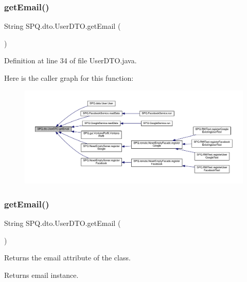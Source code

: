 \subsubsection{\texorpdfstring{get\+Email()}{getEmail()}\hspace{0.1cm}{\footnotesize\ttfamily [2/3]}}
{\footnotesize\ttfamily String S\+P\+Q.\+dto.\+User\+D\+T\+O.\+get\+Email (\begin{DoxyParamCaption}{ }\end{DoxyParamCaption})}



Definition at line 34 of file User\+D\+T\+O.\+java.

Here is the caller graph for this function\+:\nopagebreak
\begin{figure}[H]
\begin{center}
\leavevmode
\includegraphics[width=350pt]{class_s_p_q_1_1dto_1_1_user_d_t_o_a67038ab8bab7cb7119ece00bcb20a360_icgraph}
\end{center}
\end{figure}
\mbox{\label{class_s_p_q_1_1dto_1_1_user_d_t_o_a67038ab8bab7cb7119ece00bcb20a360}} 
\subsubsection{\texorpdfstring{get\+Email()}{getEmail()}\hspace{0.1cm}{\footnotesize\ttfamily [3/3]}}
{\footnotesize\ttfamily String S\+P\+Q.\+dto.\+User\+D\+T\+O.\+get\+Email (\begin{DoxyParamCaption}{ }\end{DoxyParamCaption})}

Returns the email attribute of the class. \begin{DoxyReturn}{Returns}
email instance. 
\end{DoxyReturn}



